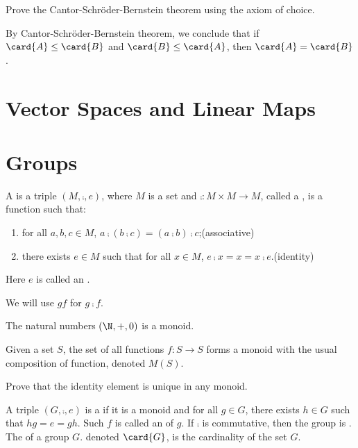 \documentclass[10pt]{article}
\begin{document}
\begin{problem}
    Prove the Cantor-Schröder-Bernstein theorem using the axiom of choice.
\end{problem}
\par
By Cantor-Schröder-Bernstein theorem, we conclude that if $\card{A}\le\card{B}$ and $\card{B}\le\card{A}$, then $\card{A}=\card{B}$.
\section{Vector Spaces and Linear Maps}

\newpage

 

\newpage
\section{Groups}
\begin{definition}
    A  is a triple $(M,\comp,e)$, where $M$ is a set and $\comp:M\times M\to M$, called a , is a function such that:
    \begin{enumerate}
        \item for all $a,b,c\in M$, $a\comp(b\comp c)=(a\comp b)\comp c$;\hfill(associative)
        \item there exists $e\in M$ such that for all $x\in M$, $e\comp x=x=x\comp e$.\hfill(identity)
    \end{enumerate}
    Here $e$ is called an .
\end{definition}
\begin{remark}
    We will use $gf$ for $g\comp f$.
\end{remark}
\begin{example}
    The natural numbers $(\N,+,0)$ is a monoid.
\end{example}
\begin{example}
    Given a set $S$, the set of all functions $f:S\to S$ forms a monoid with the usual composition of function, denoted $M(S)$.
\end{example}
\begin{problem}
    Prove that the identity element is unique in any monoid.
\end{problem}
\begin{definition}
    A triple $(G,\comp,e)$ is a  if it is a monoid and for all $g\in G$, there exists $h\in G$ such that $hg=e=gh$. Such $f$ is called an  of $g$. If $\comp$ is commutative, then the group is . The  of a group $G$. denoted $\card{G}$, is the cardinality of the set $G$.
\end{definition}
\end{document}
